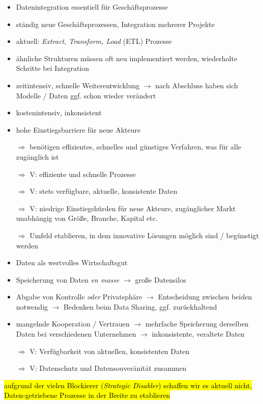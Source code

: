 \begin{itemize}
    \item Datenintegration essentiell für Geschäftsprozesse
    \item ständig neue Geschäftsprozessen, Integration mehrerer Projekte
    \item aktuell: \emph{Extract, Transform, Load} (ETL) Prozesse
    \item ähnliche Strukturen müssen oft neu implementiert werden, wiederholte Schritte bei Integration
    \item zeitintensiv, schnelle Weiterentwicklung $\to$ nach Abschluss haben sich Modelle / Daten ggf. schon wieder verändert
    \item kostenintensiv, inkonsistent
    \item hohe Einstiegsbarriere für neue Akteure
    \item[$\Rightarrow$] benötigen effizientes, schnelles und günstiges Verfahren, was für alle zugänglich ist
    \item[$\Rightarrow$] V: effiziente und schnelle Prozesse
    \item[$\Rightarrow$] V: stets verfügbare, aktuelle, konsistente Daten
    \item[$\Rightarrow$] V: niedrige Einstiegshürden für neue Akteure, zugänglicher Markt unabhängig von Größe, Branche, Kapital etc.
    \item[$\Rightarrow$] Umfeld etablieren, in dem innovative Lösungen möglich sind / begünstigt werden
\end{itemize}

\vspace{1cm}

\begin{itemize}
    \item Daten als wertvolles Wirtschaftsgut
    \item Speicherung von Daten \emph{en masse} $\to$ große Datensilos
    \item Abgabe von Kontrolle \emph{oder} Privatsphäre $\to$ Entscheidung zwischen beiden notwendig $\to$ Bedenken beim Data Sharing, ggf. zurückhaltend
    \item mangelnde Kooperation / Vertrauen $\to$ mehrfache Speicherung derselben Daten bei verschiedenen Unternehmen $\to$ inkonsistente, veraltete Daten
    \item[$\Rightarrow$] V: Verfügbarkeit von aktuellen, konsistenten Daten
    \item[$\Rightarrow$] V: Datenschutz und Datensouveränität zusammen
\end{itemize}

\hl{aufgrund der vielen Blockierer (\emph{Strategic Disabler}) schaffen wir es aktuell nicht, Daten-getriebene Prozesse in der Breite zu etablieren}
